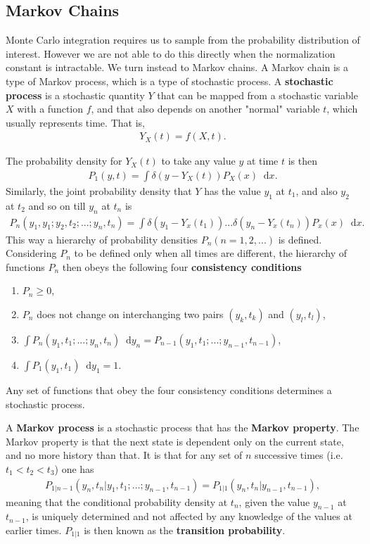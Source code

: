 \documentclass[twoside,english]{uiofysmaster}
\newcommand*\dif{\mathop{}\!\mathrm{d}}
\begin{document}
\subsection{Markov Chains}
\label{sec:MarkovChains}

Monte Carlo integration requires us to sample from the probability
distribution of interest. However we are not able to do this directly
when the normalization constant is intractable. We turn instead to
Markov chains. A Markov chain is a type of Markov process, which is a
type of stochastic process. A \textbf{stochastic process} is a
stochastic quantity $Y$ that can be mapped from a stochastic variable
$X$ with a function $f$, and that also depends on another "normal"
variable $t$, which usually represents time. That is,
\begin{align}
	Y_X (t) = f(X,t).
\end{align}


The probability density for $Y_X(t)$ to take any value $y$ at time $t$ is then
\begin{align}
	P_1 (y, t) = \int \delta (y- Y_X (t)) P_X (x) \dif x.
\end{align}
Similarly, the joint probability density that $Y$ has the value $y_1$
at $t_1$, and also $y_2$ at $t_2$ and so on till $y_n$ at $t_n$ is
\begin{align}
	P_n (y_1, y_1; y_2, t_2; ...; y_n, t_n)
	= \int \delta (y_1 - Y_x (t_1)) ... \delta (y_n - Y_x (t_n)) P_x (x) \dif x.
\end{align}
This way a hierarchy of probability densities $P_n (n=1,2,...)$ is defined.
Considering $P_n$ to be defined only when all times are different, the hierarchy of functions $P_n$ then obeys the following four \textbf{consistency conditions}
\begin{enumerate}
	\item $P_n \geq 0$,
	\item $P_n$ does not change on interchanging two pairs $(y_k, t_k)$ and $(y_l, t_l)$,
	\item $\int P_n (y_1, t_1; ...; y_n, t_n) \dif y_n = P_{n-1} (y_1, t_1; ...; y_{n-1}, t_{n-1}) $,
	\item $\int P_1 (y_1, t_1) \dif y_1 = 1$.
\end{enumerate}
Any set of functions that obey the four consistency conditions determines a stochastic process.


A \textbf{Markov process} is a stochastic process that has the
\textbf{Markov property}. The Markov property is that the next state
is dependent only on the current state, and no more history than
that. It is that for any set of $n$ successive times
(i.e. $t_1<t_2<t_3$) one has
\begin{align}
	P_{1|n-1} (y_n, t_n | y_1, t_1; ...; y_{n-1}, t_{n-1}) = P_{1|1} (y_n, t_n | y_{n-1}, t_{n-1}),
\end{align}
meaning that the conditional probability density at $t_n$, given the value $y_{n-1}$ at $t_{n-1}$, is uniquely determined and not affected by any knowledge of the values at earlier times. $P_{1|1}$ is then known as the \textbf{transition probability}.
\end{document}
